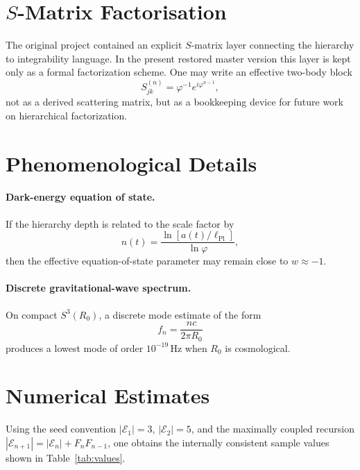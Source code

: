 \documentclass[
  aps,
  prd,
  reprint,
  superscriptaddress,
  nofootinbib,
  longbibliography,
  amsmath,
  amssymb
]{revtex4-2}
\theoremstyle{remark}
\newcommand{\Sthree}{S^{3}}
\newcommand{\lPl}{\ell_{\mathrm{Pl}}}
\newcommand{\phig}{\varphi}
\begin{document}
\appendix

\section{$S$-Matrix Factorisation}
\label{app:smatrix}

The original project contained an explicit $S$-matrix layer connecting the hierarchy to integrability language. In the present restored master version this layer is kept only as a formal factorization scheme. One may write an effective two-body block
\begin{equation}
S^{(n)}_{jk}=\phig^{-1}e^{i\phig^{n-1}},
\end{equation}
not as a derived scattering matrix, but as a bookkeeping device for future work on hierarchical factorization.

\section{Phenomenological Details}
\label{app:pheno}

\paragraph{Dark-energy equation of state.}
If the hierarchy depth is related to the scale factor by
\begin{equation}
 n(t)=\frac{\ln[a(t)/\lPl]}{\ln\phig},
\end{equation}
then the effective equation-of-state parameter may remain close to $w\approx -1$.

\paragraph{Discrete gravitational-wave spectrum.}
On compact $\Sthree(R_0)$, a discrete mode estimate of the form
\begin{equation}
 f_n=\frac{nc}{2\pi R_0}
\end{equation}
produces a lowest mode of order $10^{-19}\,\mathrm{Hz}$ when $R_0$ is cosmological.

\section{Numerical Estimates}
\label{app:numbers}

Using the seed convention $|\mathcal E_1|=3$, $|\mathcal E_2|=5$, and the maximally coupled recursion $|\mathcal E_{n+1}|=|\mathcal E_n|+F_nF_{n-1}$, one obtains the internally consistent sample values shown in Table~\ref{tab:values}.
\end{document}
